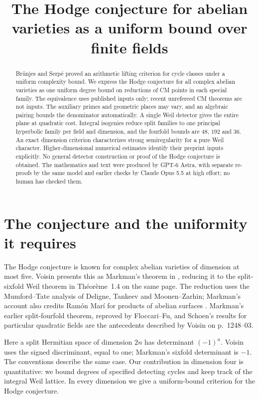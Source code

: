 \documentclass[11pt]{article}
\title{The Hodge conjecture for abelian varieties as a uniform bound over finite fields}
\author{}
\date{}
\theoremstyle{definition}
\theoremstyle{remark}
\begin{document}
\maketitle
\begin{abstract}
Br\"unjes and Serp\'e proved an arithmetic lifting criterion for cycle
classes under a uniform complexity bound. We express the Hodge conjecture
for all complex abelian varieties as one uniform degree bound on
reductions of CM points in each special family. The equivalence uses
published inputs only; recent unrefereed CM theorems are not inputs.
The auxiliary primes and geometric places may vary, and an algebraic
pairing bounds the denominator automatically. A single Weil detector
gives the entire plane at quadratic cost. Integral isogenies reduce
split families to one principal hyperbolic family per field and
dimension, and the fourfold bounds are $48$, $192$ and $36$.
An exact dimension criterion characterizes strong semiregularity
for a pure Weil character. Higher-dimensional numerical estimates
identify their preprint inputs explicitly. No general detector
construction or proof of the Hodge conjecture is obtained.
The mathematics and text were produced by GPT-6 Astra, with separate
re-proofs by the same model and earlier checks by Claude Opus 5.5
at high effort; no human has checked them.
\end{abstract}
\section{The conjecture and the uniformity it requires}
\label{sec:introduction}

The Hodge conjecture is known for complex abelian varieties of dimension
at most five. Voisin presents this as Markman's theorem in
\cite[Th\'eor\`eme~1.3, p.~1248--03]{VoisinB}, reducing it to the
split-sixfold Weil theorem in Th\'eor\`eme~1.4 on the same page.
The reduction uses the Mumford--Tate analysis of Deligne, Tankeev and
Moonen--Zarhin; Markman's account also credits Ram\'on Mar\'i for products
of abelian surfaces \cite[Corollary~1.3, pp.~587--588]{MarkmanICM}.
Markman's earlier split-fourfold theorem, reproved by Floccari--Fu,
and Schoen's results for particular quadratic fields are the antecedents
described by Voisin on p.~1248--03.

Here a split Hermitian space of dimension $2n$ has determinant $(-1)^n$.
Voisin uses the signed discriminant, equal to one; Markman's sixfold
determinant is $-1$. The conventions describe the same case. Our
contribution in dimension four is quantitative: we bound degrees of
specified detecting cycles and keep track of the integral Weil lattice.
In every dimension we give a uniform-bound criterion for the Hodge
conjecture.
\end{document}
